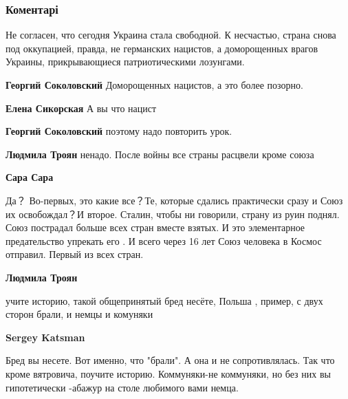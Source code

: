  
 
 
 
 
\subsubsection{Коментарі}
\label{sec:28_10_2021.fb.murajev_jevgenij.1.ukraina_osvobozhdenie.cmt}

\begin{itemize} %

Не согласен, что сегодня Украина стала свободной. К несчастью, страна снова под
оккупацией, правда, не германских нацистов, а доморощенных врагов Украины,
прикрывающиеся патриотическими лозунгами.

\begin{itemize} %
\textbf{Георгий Соколовский} Доморощенных нацистов, а это более позорно.

\textbf{Елена Сикорская} А вы что нацист

\textbf{Георгий Соколовский} поэтому надо повторить урок.

\begin{itemize} %
\textbf{Людмила Троян} ненадо. После войны все страны расцвели кроме союза

\textbf{Сара Сара} 

Да？ Во-первых, это какие все？Те, которые сдались практически сразу и Союз их
освобождал？И второе. Сталин, чтобы ни говорили, страну из руин поднял. Союз
пострадал больше всех стран вместе взятых. И это элементарное предательство
упрекать его . И всего через 16 лет Союз человека в Космос отправил. Первый из
всех стран.

\textbf{Людмила Троян} 

учите историю, такой общепринятый бред несёте, Польша , пример, с двух сторон
брали, и немцы и комуняки

\textbf{Sergey Katsman} 

Бред вы несете. Вот именно, что "брали". А она и не сопротивлялась. Так что
кроме вятровича, поучите историю. Коммуняки-не коммуняки, но без них вы
гипотетически -абажур на столе любимого вами немца.


\end{itemize}
\end{itemize}
\end{itemize}
